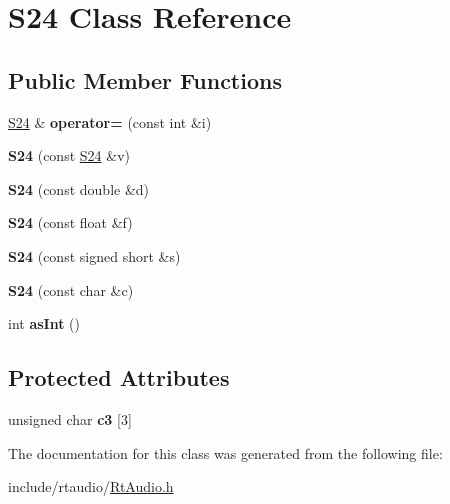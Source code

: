 \hypertarget{class_s24}{}\section{S24 Class Reference}
\label{class_s24}
\subsection*{Public Member Functions}
\begin{DoxyCompactItemize}
\item 
\hyperlink{class_s24}{S24} \& {\bfseries operator=} (const int \&i)\hypertarget{class_s24_a2c5fc98b36a246a265348a88d159a7b0}{}\label{class_s24_a2c5fc98b36a246a265348a88d159a7b0}

\item 
{\bfseries S24} (const \hyperlink{class_s24}{S24} \&v)\hypertarget{class_s24_a6cdd610b771b1ca8a8d3da802a5590f6}{}\label{class_s24_a6cdd610b771b1ca8a8d3da802a5590f6}

\item 
{\bfseries S24} (const double \&d)\hypertarget{class_s24_ac564c07e2b8a6ab4ac7180c28df667e1}{}\label{class_s24_ac564c07e2b8a6ab4ac7180c28df667e1}

\item 
{\bfseries S24} (const float \&f)\hypertarget{class_s24_ad57aa8c0091f72cf3fd07b7422767498}{}\label{class_s24_ad57aa8c0091f72cf3fd07b7422767498}

\item 
{\bfseries S24} (const signed short \&s)\hypertarget{class_s24_a52d1cd0358fdee60f72674e6387d3483}{}\label{class_s24_a52d1cd0358fdee60f72674e6387d3483}

\item 
{\bfseries S24} (const char \&c)\hypertarget{class_s24_ab128c99dd4028572111c5cddd2c75f2f}{}\label{class_s24_ab128c99dd4028572111c5cddd2c75f2f}

\item 
int {\bfseries as\+Int} ()\hypertarget{class_s24_a1068ab5501879b85438e5706eacd95f0}{}\label{class_s24_a1068ab5501879b85438e5706eacd95f0}

\end{DoxyCompactItemize}
\subsection*{Protected Attributes}
\begin{DoxyCompactItemize}
\item 
unsigned char {\bfseries c3} \mbox{[}3\mbox{]}\hypertarget{class_s24_a6364edb04d6fea8fb4feff17bdee585b}{}\label{class_s24_a6364edb04d6fea8fb4feff17bdee585b}

\end{DoxyCompactItemize}


The documentation for this class was generated from the following file\+:\begin{DoxyCompactItemize}
\item 
include/rtaudio/\hyperlink{_rt_audio_8h}{Rt\+Audio.\+h}\end{DoxyCompactItemize}
